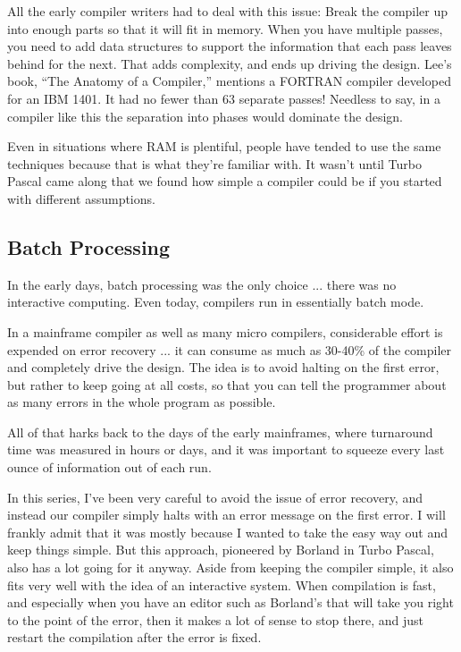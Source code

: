 All the early compiler writers  had to deal with this issue: Break the compiler up into enough parts so that it  will fit in memory. When  you  have multiple passes, you need to add data structures to support the  information  that  each pass leaves behind for the next. That adds complexity, and ends up driving the  design. Lee's  book, ``The  Anatomy  of a Compiler,''  mentions a FORTRAN compiler developed for an IBM 1401. It had no fewer than 63 separate passes!  Needless to say, in a compiler like this  the  separation  into  phases would dominate the design.

Even in  situations  where  RAM  is  plentiful, people have tended  to  use  the same techniques because  that  is  what they're familiar with. It  wasn't  until Turbo Pascal came along that we found how simple a compiler could  be  if  you started with different assumptions.

\subsection{Batch Processing}

In the early days, batch  processing was the only choice ... there was no interactive computing. Even  today, compilers run in essentially batch mode.

In a mainframe compiler as  well  as  many  micro compilers, considerable effort is expended on error recovery ... it can consume as much as 30-40\%  of  the  compiler  and completely drive the design. The idea is to avoid halting on the first error, but rather to keep going at all costs, so  that  you can  tell  the  programmer about as many errors in the whole program as possible.

All of that harks back to the days of the  early mainframes, where turnaround time was measured  in hours or days, and it was important to squeeze every last ounce of information out of each run.

In this series, I've been very careful to avoid the issue of error recovery, and instead our compiler  simply  halts with an error message on  the  first error. I will frankly admit that it was mostly because I wanted to take the easy way out and keep things simple. But  this  approach, pioneered by Borland in Turbo Pascal, also has a lot going for it anyway. Aside from keeping the  compiler  simple, it also fits very well  with   the  idea  of  an  interactive  system. When compilation is  fast, and especially when you have an editor such as Borland's that  will  take you right to the point of the error, then it makes a  lot  of sense to stop there, and just restart the compilation after the error is fixed.

